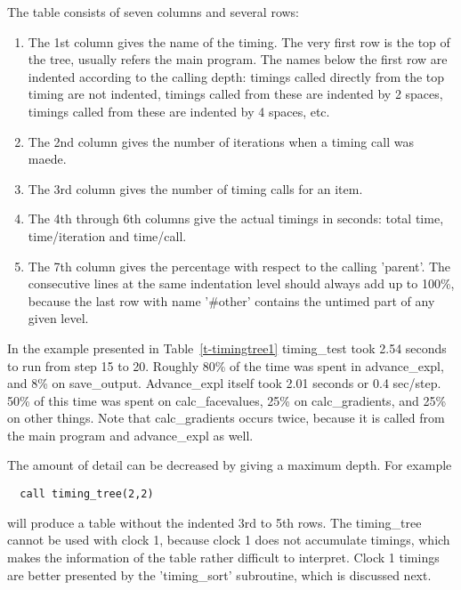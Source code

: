The table consists of seven columns and several rows:
\begin{enumerate}
\item 
The 1st column gives the name of the timing. 
    The very first row is the top of the tree, usually refers the main program.
    The names below the first row are indented according to the calling depth:
    timings called directly from the top timing are not indented, 
    timings called from these are indented by 2 spaces, 
    timings called from these are indented by 4 spaces, etc.
\item
The 2nd column gives the number of iterations when a timing call was maede.
\item
The 3rd column gives the number of timing calls for an item.
\item
The 4th through 6th columns give the actual timings in seconds: 
    total time, time/iteration and time/call.
\item
The 7th column gives the percentage with respect to the 
    calling 'parent'. The consecutive lines at the
    same indentation level should always add up to 100\%, because
    the last row with name '\#other' contains the untimed part of any 
    given level.
\end{enumerate}

In the example presented in Table~\ref{t-timingtree1} 
timing\_test took 2.54 seconds to run from step 15 to 20. 
Roughly 80\% of the time was spent in advance\_expl, and 8\% on save\_output.
Advance\_expl itself took 2.01 seconds or 0.4 sec/step. 50\% of this time
was spent on calc\_facevalues, 25\% on calc\_gradients, and 25\% on 
other things.
Note that calc\_gradients occurs twice, because it is called from
the main program and advance\_expl as well. 

The amount of detail can be decreased by giving a maximum depth. For example
\begin{verbatim}
  call timing_tree(2,2)
\end{verbatim}
will produce a table without the indented 3rd to 5th rows. 
The timing\_tree cannot be used with clock 1, because clock 1 does
not accumulate timings, which makes the information of the table
rather difficult to interpret. Clock 1 timings are better presented
by the 'timing\_sort' subroutine, which is discussed next.


